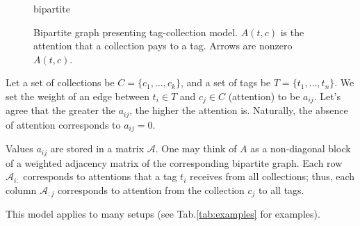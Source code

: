 \documentclass{llncs}
\begin{document}
\begin{figure}
    \centering
    {bipartite}
    \caption{Bipartite graph presenting tag-collection model. $A(t,c)$ is the attention that a collection pays to a tag. Arrows are nonzero $A(t,c)$.}
    \label{fig:nice_name}
\end{figure}

Let a set of collections be $C = \{c_1, \dots, c_k\}$, and a set of tags be $T = \{t_1, \dots, t_n\}$.
We set the weight of an edge between $t_i \in T$ and $c_j \in C$ (attention) to be $a_{ij}$.
Let's agree that the greater the $a_{ij}$, the higher the attention is. Naturally, the absence of attention corresponds to $a_{ij} = 0$. 

Values $a_{ij}$ are stored in a matrix $\mathcal{A}$. One may think of $A$ as a non-diagonal block of a weighted adjacency matrix of the corresponding bipartite graph. Each row $\mathcal{A}_{i:}$ corresponds to attentions that a tag $t_i$ receives from all collections; thus, each column $\mathcal{A}_{:j}$ corresponds to attention from the collection $c_j$ to all tags.

This model applies to many setups (see Tab.\ref{tab:examples} for examples).
\end{document}
